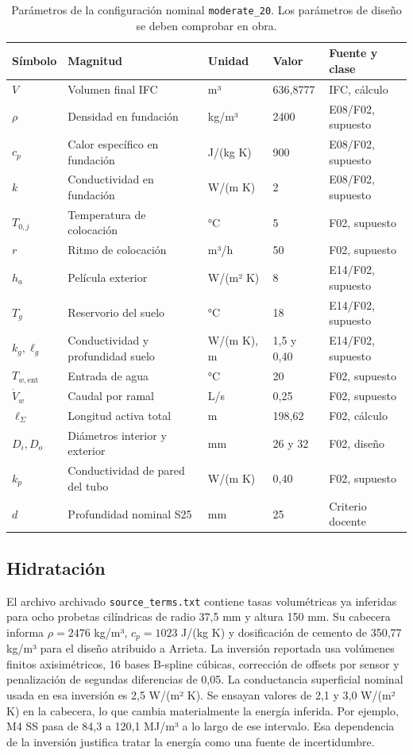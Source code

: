 \documentclass[11pt,a4paper]{article}
\newcommand{\plan}[1]{\texttt{#1}}
\begin{document}
\begin{table}[htbp]
\centering\small
\caption{Parámetros de la configuración nominal \plan{moderate\_20}. Los parámetros de diseño se deben comprobar en obra.}
\label{tab:param}
\begin{tabularx}{\linewidth}{@{}lXlll@{}}
\toprule
Símbolo & Magnitud & Unidad & Valor & Fuente y clase \\
\midrule
$V$ & Volumen final IFC & m³ & 636,8777 & IFC, cálculo \\
$\rho$ & Densidad en fundación & kg/m³ & 2400 & E08/F02, supuesto \\
$c_p$ & Calor específico en fundación & J/(kg K) & 900 & E08/F02, supuesto \\
$k$ & Conductividad en fundación & W/(m K) & 2 & E08/F02, supuesto \\
$T_{0,j}$ & Temperatura de colocación & °C & 5 & F02, supuesto \\
$r$ & Ritmo de colocación & m³/h & 50 & F02, supuesto \\
$h_a$ & Película exterior & W/(m² K) & 8 & E14/F02, supuesto \\
$T_g$ & Reservorio del suelo & °C & 18 & E14/F02, supuesto \\
$k_g,\ell_g$ & Conductividad y profundidad suelo & W/(m K), m & 1,5 y 0,40 & E14/F02, supuesto \\
$T_{w,\mathrm{ent}}$ & Entrada de agua & °C & 20 & F02, supuesto \\
$\dot V_w$ & Caudal por ramal & L/s & 0,25 & F02, supuesto \\
$\ell_\Sigma$ & Longitud activa total & m & 198,62 & F02, cálculo \\
$D_i,D_o$ & Diámetros interior y exterior & mm & 26 y 32 & F02, diseño \\
$k_p$ & Conductividad de pared del tubo & W/(m K) & 0,40 & F02, supuesto \\
$d$ & Profundidad nominal S25 & mm & 25 & Criterio docente \\
\bottomrule
\end{tabularx}
\end{table}

\subsection*{Hidratación}
El archivo archivado \plan{source\_terms.txt} contiene tasas volumétricas ya inferidas para ocho probetas cilíndricas de radio 37,5 mm y altura 150 mm. Su cabecera informa $\rho=2476$ kg/m³, $c_p=1023$ J/(kg K) y dosificación de cemento de 350,77 kg/m³ para el diseño atribuido a Arrieta. La inversión reportada usa volúmenes finitos axisimétricos, 16 bases B-spline cúbicas, corrección de offsets por sensor y penalización de segundas diferencias de 0,05. La conductancia superficial nominal usada en esa inversión es 2,5 W/(m² K). Se ensayan valores de 2,1 y 3,0 W/(m² K) en la cabecera, lo que cambia materialmente la energía inferida. Por ejemplo, M4 SS pasa de 84,3 a 120,1 MJ/m³ a lo largo de ese intervalo. Esa dependencia de la inversión justifica tratar la energía como una fuente de incertidumbre.
\end{document}
